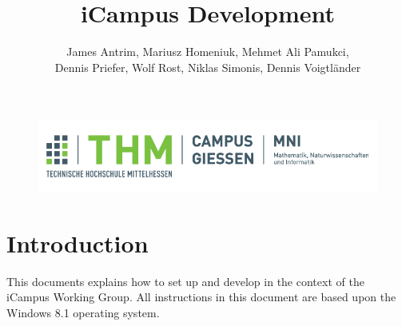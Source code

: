\documentclass[]{report}
\begin{document}
\title{iCampus Development}
\author{James Antrim, Mariusz Homeniuk, Mehmet Ali Pamukci,\\Dennis Priefer, Wolf Rost, Niklas Simonis, Dennis Voigtl\"ander}

\begin{figure}
\includegraphics[width=14cm]{thm.png}
\maketitle
\end{figure}

\newpage
\tableofcontents

\chapter{Introduction}

This documents explains how to set up and develop in the context of the iCampus Working Group. All instructions in this document are based upon the Windows 8.1 operating system.




\end{document}
